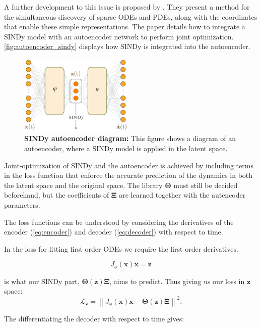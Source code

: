 A further development to this issue is proposed by \textcite{Champion_2019}. 
They present a method for the simultaneous discovery of sparse ODEs and PDEs, along with the coordinates that enable these simple representations. 
The paper details how to integrate a SINDy model with an autoencoder network to perform joint optimization.
\autoref{fig:autoencoder_sindy} displays how SINDy is integrated into the autoencoder. 
\begin{figure}[H]
    \centering
    \includegraphics[width=0.48\textwidth]{project_2/images/autoencoder_diagram.pdf}
    \caption{\textbf{SINDy autoencoder diagram:} This figure shows a diagram of an autoencoder, where a SINDy model is applied in the latent space.}
    \label{fig:autoencoder_sindy}
\end{figure}
Joint-optimization of SINDy and the autoencoder is achieved by including terms in the loss function that enforce the accurate prediction of the dynamics in both the latent space and the original space. 
The library $\mathbf\Theta$ must still be decided beforehand, but the coefficients of $\mathbf\Xi$ are learned together with the autencoder parameters.

The loss functions can be understood by considering the derivatives of the encoder (\ref{eq:encoder}) and decoder (\ref{eq:decoder}) with respect to time. 

In the loss for fitting first order ODEs we require the first order derivatives.

\begin{equation}
     J_{\phi} (\mathbf{x})  \dot{\mathbf{x}} = \dot{\mathbf{z}}
\end{equation}

is what our SINDy part, $\boldsymbol{\Theta}(\mathbf{z}) \boldsymbol{\Xi}$, aims to predict. Thus giving us our loss in $\mathbf{z}$ space:
$$
\mathcal{L}_{\mathbf{z}}=\left\|J_{\phi}(\mathbf{x}) \dot{\mathbf{x}}-\boldsymbol{\Theta}(\mathbf{z}) \boldsymbol{\Xi}\right\|^2.
$$

The differentiating the decoder with respect to time gives:

